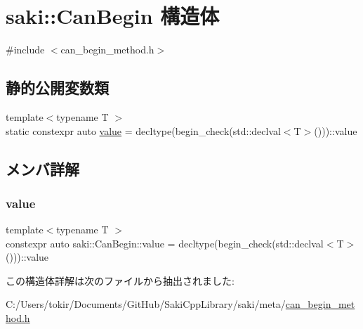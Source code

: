 \hypertarget{structsaki_1_1_can_begin}{}\section{saki\+:\+:Can\+Begin 構造体}
\label{structsaki_1_1_can_begin}


{\ttfamily \#include $<$can\+\_\+begin\+\_\+method.\+h$>$}

\subsection*{静的公開変数類}
\begin{DoxyCompactItemize}
\item 
{\footnotesize template$<$typename T $>$ }\\static constexpr auto \mbox{\hyperlink{structsaki_1_1_can_begin_abd4e5cbf549dbd55bc2421476a94b505}{value}} = decltype(begin\+\_\+check(std\+::declval$<$T$>$()))\+::value
\end{DoxyCompactItemize}


\subsection{メンバ詳解}
\mbox{\label{structsaki_1_1_can_begin_abd4e5cbf549dbd55bc2421476a94b505}} 
\subsubsection{\texorpdfstring{value}{value}}
{\footnotesize\ttfamily template$<$typename T $>$ \\
constexpr auto saki\+::\+Can\+Begin\+::value = decltype(begin\+\_\+check(std\+::declval$<$T$>$()))\+::value\hspace{0.3cm}{\ttfamily [static]}}



この構造体詳解は次のファイルから抽出されました\+:\begin{DoxyCompactItemize}
\item 
C\+:/\+Users/tokir/\+Documents/\+Git\+Hub/\+Saki\+Cpp\+Library/saki/meta/\mbox{\hyperlink{can__begin__method_8h}{can\+\_\+begin\+\_\+method.\+h}}\end{DoxyCompactItemize}
